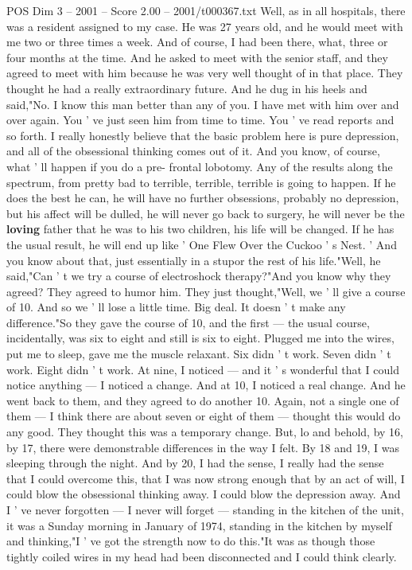\begin{textsample}{POS Dim 3 – 2001 – Score 2.00 – 2001/t000367.txt}
Well, as in all hospitals, there was a resident assigned to my case.
He was 27 years old, and he would meet with me two or three times a week.
And of course, I had been there, what, three or four months at the time.
And he asked to meet with the senior staff, and they agreed to meet with him because he was very well thought of in that place.
They thought he had a really extraordinary future.
And he dug in his heels and said,"No.
I know this man better than any of you.
I have met with him over and over again.
You ' ve just seen him from time to time.
You ' ve read reports and so forth.
I really honestly believe that the basic problem here is pure depression, and all of the obsessional thinking comes out of it.
And you know, of course, what ' ll happen if you do a pre- frontal lobotomy.
Any of the results along the spectrum, from pretty bad to terrible, terrible, terrible is going to happen.
If he does the best he can, he will have no further obsessions, probably no depression, but his affect will be dulled, he will never go back to surgery, he will never be the \textbf{loving} father that he was to his two children, his life will be changed.
If he has the usual result, he will end up like ' One Flew Over the Cuckoo ' s Nest. ' And you know about that, just essentially in a stupor the rest of his life."Well, he said,"Can ' t we try a course of electroshock therapy?"And you know why they agreed?
They agreed to humor him.
They just thought,"Well, we ' ll give a course of 10.
And so we ' ll lose a little time.
Big deal.
It doesn ' t make any difference."So they gave the course of 10, and the first — the usual course, incidentally, was six to eight and still is six to eight.
Plugged me into the wires, put me to sleep, gave me the muscle relaxant.
Six didn ' t work.
Seven didn ' t work.
Eight didn ' t work.
At nine, I noticed — and it ' s wonderful that I could notice anything — I noticed a change.
And at 10, I noticed a real change.
And he went back to them, and they agreed to do another 10.
Again, not a single one of them — I think there are about seven or eight of them — thought this would do any good.
They thought this was a temporary change.
But, lo and behold, by 16, by 17, there were demonstrable differences in the way I felt.
By 18 and 19, I was sleeping through the night.
And by 20, I had the sense, I really had the sense that I could overcome this, that I was now strong enough that by an act of will, I could blow the obsessional thinking away.
I could blow the depression away.
And I ' ve never forgotten — I never will forget — standing in the kitchen of the unit, it was a Sunday morning in January of 1974, standing in the kitchen by myself and thinking,"I ' ve got the strength now to do this."It was as though those tightly coiled wires in my head had been disconnected and I could think clearly.

\end{textsample}
